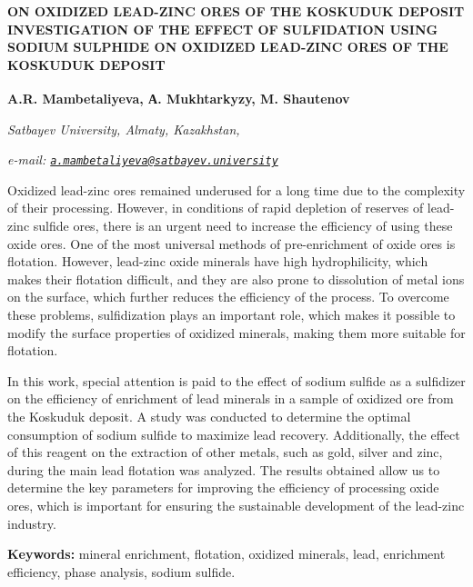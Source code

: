 \begin{articleheader}
{\bfseries ON OXIDIZED LEAD-ZINC ORES OF THE KOSKUDUK DEPOSIT INVESTIGATION OF THE EFFECT OF SULFIDATION USING SODIUM SULPHIDE ON OXIDIZED LEAD-ZINC ORES OF THE KOSKUDUK DEPOSIT}

{\bfseries
A.R. Mambetaliyeva\textsuperscript{\envelope },
А. Mukhtarkyzy,
M. Shautenov}
\end{articleheader}

\begin{affiliation}
\emph{Satbayev University, Almaty, Kazakhstan,}

\emph{e-mail: \href{mailto:a.mambetaliyeva@satbayev.university}{\nolinkurl{a.mambetaliyeva@satbayev.university}}}
\end{affiliation}

Oxidized lead-zinc ores remained underused for a long time due to the
complexity of their processing. However, in conditions of rapid
depletion of reserves of lead-zinc sulfide ores, there is an urgent need
to increase the efficiency of using these oxide ores. One of the most
universal methods of pre-enrichment of oxide ores is flotation. However,
lead-zinc oxide minerals have high hydrophilicity, which makes their
flotation difficult, and they are also prone to dissolution of metal
ions on the surface, which further reduces the efficiency of the
process. To overcome these problems, sulfidization plays an important
role, which makes it possible to modify the surface properties of
oxidized minerals, making them more suitable for flotation.

In this work, special attention is paid to the effect of sodium sulfide
as a sulfidizer on the efficiency of enrichment of lead minerals in a
sample of oxidized ore from the Koskuduk deposit. A study was conducted
to determine the optimal consumption of sodium sulfide to maximize lead
recovery. Additionally, the effect of this reagent on the extraction of
other metals, such as gold, silver and zinc, during the main lead
flotation was analyzed. The results obtained allow us to determine the
key parameters for improving the efficiency of processing oxide ores,
which is important for ensuring the sustainable development of the
lead-zinc industry.

{\bfseries Keywords:} mineral enrichment, flotation, oxidized minerals,
lead, enrichment efficiency, phase analysis, sodium sulfide.

